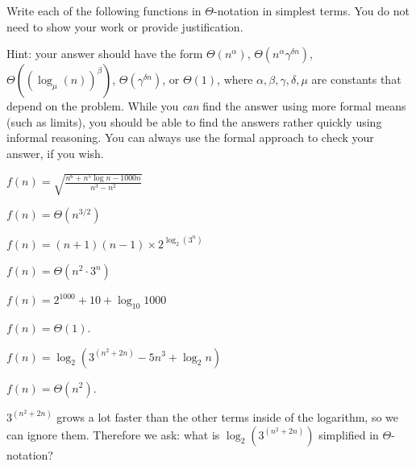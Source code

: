 \begin{prob}
    Write each of the following functions in $\Theta$-notation in simplest terms.
    You do not need to show your work or provide justification.

    Hint: your answer should have the form $\Theta(n^\alpha)$, $\Theta(n^\alpha
    \gamma^{\delta n})$, $\Theta((\log_\mu(n))^\beta)$, $\Theta(\gamma^{\delta
    n})$, or $\Theta(1)$, where $\alpha, \beta, \gamma, \delta, \mu$ are
    constants that depend on the problem. While you \emph{can} find the answer
    using more formal means (such as limits), you should be able to find the
    answers rather quickly using informal reasoning. You can always use the
    formal approach to check your answer, if you wish.

    \begin{subprobset}

        \begin{subprob}
            $\displaystyle f(n) = \sqrt{\frac{n^6 + n^5 \log n - 1000n}{n^3 - n^2}}$

            \begin{soln}
                $f(n) = \Theta(n^{3/2})$
            \end{soln}
        \end{subprob}

        \begin{subprob}
            $f(n) = (n + 1)(n-1) \times 2^{\log_2 (3^n) }$

            \begin{soln}
                $f(n) = \Theta(n^2 \cdot 3^n)$
            \end{soln}
        \end{subprob}

        \begin{subprob}
            $f(n) = 2^{1000} + 10 + \log_{10} 1000$

            \begin{soln}
                $f(n) = \Theta(1)$.
            \end{soln}
        \end{subprob}

        \begin{subprob}
            $f(n) = \log_2(3^{(n^2 + 2n)} - 5n^3 + \log_2 n)$

            \begin{soln}
                $f(n) = \Theta(n^2)$.

                $3^{(n^2 + 2n)}$ grows a lot faster than the other terms inside of the logarithm,
                so we can ignore them. Therefore we ask: what is $\log_2(3^{(n^2 + 2n)})$ simplified
                in $\Theta$-notation?


\end{soln}
\end{subprob}
\end{subprobset}
\end{prob}
